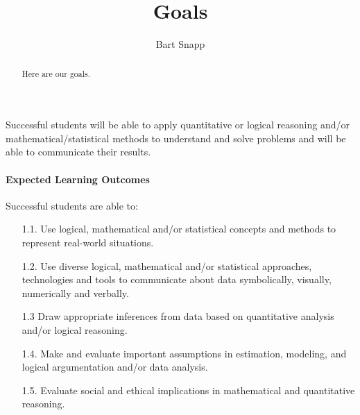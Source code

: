\documentclass{ximera}
\author{Bart Snapp}
\title{Goals}
\begin{document}
\begin{abstract}
Here are our goals.
\end{abstract}
\maketitle

Successful students will be able to apply quantitative or logical reasoning
and/or mathematical/statistical methods to understand and solve problems and
will be able to communicate their results.

\paragraph{Expected Learning Outcomes}

Successful students are able to:
\begin{enumerate}
  \item[1.1.] Use logical, mathematical and/or statistical concepts and methods
    to
    represent real-world situations.
  \item[1.2.] Use diverse logical, mathematical and/or statistical approaches,
    technologies and tools to communicate about data symbolically, visually,
    numerically and verbally.
  \item[1.3] Draw appropriate inferences from data based on quantitative
    analysis
    and/or
    logical reasoning.
  \item[1.4.] Make and evaluate important assumptions in estimation, modeling,
    and
    logical argumentation and/or data analysis.
  \item[1.5.] Evaluate social and ethical implications in mathematical and
    quantitative
    reasoning.
\end{enumerate}
\end{document}
